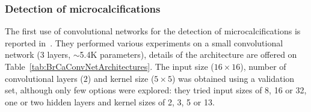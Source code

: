 \subsubsection{Detection of microcalcifications}
\begin{comment} Lo1995
- detect microcalcifications
- only years after lecun showed it to be good on the mnist dataset.
- preselected images
- Background removal with wavelet high pass filtering ("a three-level wavelet transform was used and only the lowest frequency was eliminated for high-pass filtering before image reconstruction."). For lung nodules: Background removal like constrast enhancement.
- YES/NO output. For lung nodules: degrees of sensitivity in output(1-10) instead of disease/no disease . 
- Rotation and translation invariance. 0,90,180,270 and flipped over. (all of this on the small 32 by 32 images). No use of translation, it talks about it, though.
- Uses ROC/AUC.
- Each pixel represented 0.105 mm. (for instance 16 pixel input was 1.7mm)
- Same set used for validation and test
- using the data augmented versions one after the other in training gives better performance here (not sure why)
- 30-fold crossvalidation results reported (no test set): 0.89 AUC for individual miscrocalcifications and 0.97 for clustered microcalcif. 
- not quite clear if label were beningn/malign, microcalc/non-microcalc. It hink it is detection not diagonsis
- not clear how they measure the detection of microcalc. I think, of those microcalc detected from the normal algorithm if more than 3 were in the same 1 cm^2 area, it was considered as if the convnet detcted a cluster. 
- Easier to detect clusters these way because there could be 20 micorcalcif in a 1 cm^2 area and it only needs to detect 3.
- Bunch of questions on how on hell is this done. It could be done in a way that would help a lot the results, maybe that is why they have 0.97 AUC
\end{comment}
The first use of convolutional networks for the detection of microcalcifications is reported in~\cite{Lo1995}. They performed various experiments on a small convolutional network (3 layers, $\sim$5.4K parameters), details of the architecture are offered on Table~\ref{tab:BrCaConvNetArchitectures}. The input size ($16\times 16$), number of convolutional layers ($2$) and kernel size ($5\times5$) was obtained using a validation set, although only few options were explored: they tried input sizes of 8, 16 or 32, one or two hidden layers and kernel sizes of 2, 3, 5 or 13.
